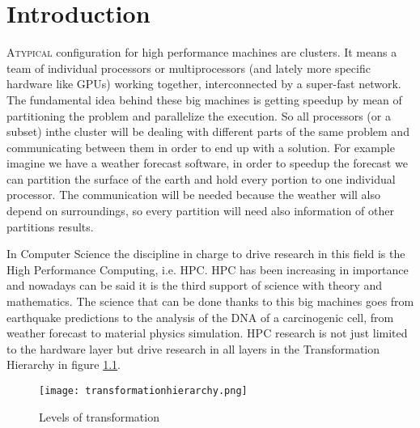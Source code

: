 \chapter{Introduction}

\lettrine{A}{typical} configuration for high performance machines are clusters.
It means a team of individual processors or multiprocessors 
(and lately more specific 
hardware like GPUs) working together, interconnected by a super-fast network. 
The fundamental idea behind these big machines is getting speedup by mean of
partitioning the problem and parallelize the execution. So all processors (or a 
subset) inthe cluster will be dealing with different parts of the same problem 
and communicating between them in order to end up with a solution. For example 
imagine we have a weather forecast software, in order to speedup the forecast 
we can partition the surface of the earth and hold every portion to one individual
processor. The communication will be needed because the weather will also depend 
on surroundings, so every partition will need also information of other partitions 
results.

In Computer Science the discipline in charge to drive research in this field is 
the High Performance Computing, i.e. HPC. HPC has been increasing in importance 
and nowadays can be said it is the third support of science with theory and 
mathematics. The science that can be done thanks to this big machines goes from 
earthquake predictions to the analysis of the DNA of a carcinogenic cell, from
weather forecast to material physics simulation. HPC research is not just limited
to the hardware layer but drive research in all layers in the Transformation 
Hierarchy\cite{transformationHierarchy} in figure \ref{transformationHierarchyImg}.

\begin{figure}
  \caption{Levels of transformation}
  \label{transformationHierarchyImg}
  \centering
    \texttt{[image: transformationhierarchy.png]}
\end{figure}

